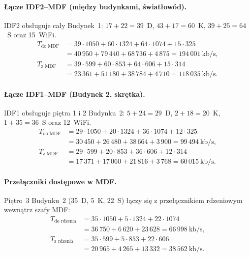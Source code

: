 \documentclass[12pt,a4paper]{article}
\begin{document}
\paragraph{Łącze IDF2--MDF (między budynkami, światłowód).} IDF2 obsługuje
cały Budynek~1: $17+22 = 39$~D, $43+17 = 60$~K, $39+25 = 64$~S oraz 15~WiFi.
\begin{align*}
T_\text{do MDF} &= 39\cdot1050 + 60\cdot1324 + 64\cdot1074 + 15\cdot325 \\
                 &= 40\,950 + 79\,440 + 68\,736 + 4\,875 = 194\,001~\text{kb/s},\\
T_\text{z MDF}  &= 39\cdot599 + 60\cdot853 + 64\cdot606 + 15\cdot314 \\
                 &= 23\,361 + 51\,180 + 38\,784 + 4\,710 = 118\,035~\text{kb/s}.
\end{align*}

\paragraph{Łącze IDF1--MDF (Budynek 2, skrętka).} IDF1 obsługuje piętra 1 i 2
Budynku~2: $5+24 = 29$~D, $2+18 = 20$~K, $1+35 = 36$~S oraz 12~WiFi.
\begin{align*}
T_\text{do MDF} &= 29\cdot1050 + 20\cdot1324 + 36\cdot1074 + 12\cdot325 \\
                 &= 30\,450 + 26\,480 + 38\,664 + 3\,900 = 99\,494~\text{kb/s},\\
T_\text{z MDF}  &= 29\cdot599 + 20\cdot853 + 36\cdot606 + 12\cdot314 \\
                 &= 17\,371 + 17\,060 + 21\,816 + 3\,768 = 60\,015~\text{kb/s}.
\end{align*}

\paragraph{Przełączniki dostępowe w MDF.} Piętro~3 Budynku~2 (35~D, 5~K,
22~S) łączy się z przełącznikiem rdzeniowym wewnątrz szafy MDF:
\begin{align*}
T_\text{do rdzenia} &= 35\cdot1050 + 5\cdot1324 + 22\cdot1074 \\
                     &= 36\,750 + 6\,620 + 23\,628 = 66\,998~\text{kb/s},\\
T_\text{z rdzenia}  &= 35\cdot599 + 5\cdot853 + 22\cdot606 \\
                     &= 20\,965 + 4\,265 + 13\,332 = 38\,562~\text{kb/s}.
\end{align*}
\end{document}
